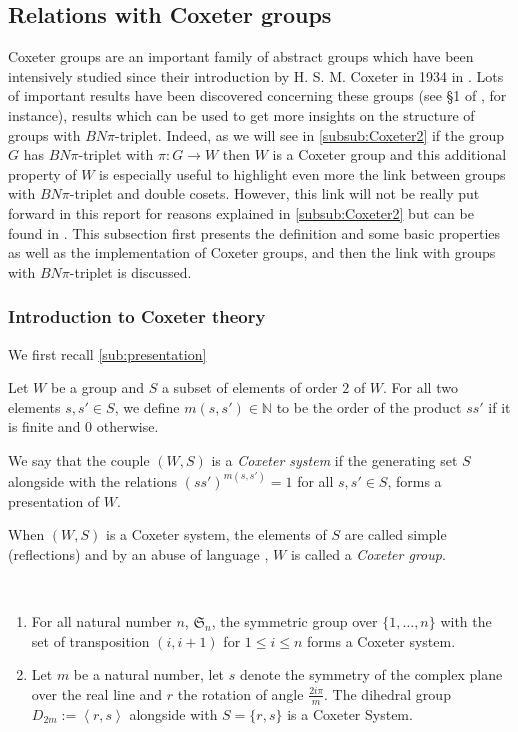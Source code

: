 \subsection{Relations with Coxeter groups}

    Coxeter groups are an important family of abstract groups which have been intensively studied since their introduction by H. S. M. Coxeter in 1934 in \cite{coxeter_discrete_1934}. 
   Lots of important results have been discovered concerning these groups (see §1 of \cite{bourbaki_groupes_2007}, for instance), results which can be used to get more insights on the structure of groups with $BN\pi$-triplet.
   Indeed, as we will see in \ref{subsub:Coxeter2} if the group $G$ has $BN\pi$-triplet with $\pi : G \to W$ then $W$ is a Coxeter group and this additional property of $W$ is especially useful to highlight even more the link between groups with $BN\pi$-triplet and double cosets. However, this link will not be really put forward in this report for reasons explained in \ref{subsub:Coxeter2} but can be found in \cite{bourbaki_groupes_2007}.
    This subsection first presents the definition and some basic properties as well as the \Lean implementation of Coxeter groups, and then the link with groups with $BN\pi$-triplet is discussed.

\subsubsection{Introduction to Coxeter theory}
We first recall \ref{sub:presentation}  

Let $W$ be a group and $S$ a subset of elements of order $2$ of $W$.
For all two elements $s, s' \in  S$, we define $m(s,s') \in  \mathbb{N}$ to be the order of the product $ss'$ if it is finite and $0$ otherwise.

\begin{definition}
    We say that the couple $(W,S)$ is a \emph{Coxeter system} if the generating set $S$ alongside with the relations $(ss')^{m\left( s,s' \right)} = 1$ for all $s,s' \in S$, forms a presentation of $W$. 
\end{definition}

When $\left( W,S \right)$ is a Coxeter system, the elements of $S$ are called simple (reflections) and by an abuse of language , $W$ is called a \emph{Coxeter group}.

\begin{ex}\

    \begin{enumerate}
        \item  For all natural number $n$, $\mathfrak{S}_n$, the symmetric group over $\{1,\ldots,n\}$ with the set of transposition $(i,i+1)$ for $1\le i \le n $ forms a Coxeter system.
        \item Let $m$ be a natural number, let $s$ denote the symmetry of the complex plane over the real line and $r$ the rotation of angle $\frac{2i \pi}{m}$. The dihedral group $D_{2m} := \left<r,s\right>$ alongside with $S= \{r,s\}$ is a Coxeter System. 
    \end{enumerate}
\end{ex}

